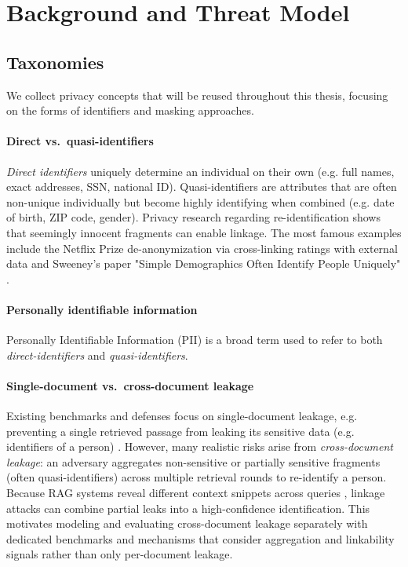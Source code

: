 \section{Background and Threat Model}\label{sec:background}
\subsection{Taxonomies}
We collect privacy concepts that will be reused throughout this thesis, focusing on the forms of identifiers and masking approaches.

\paragraph{Direct vs.\ quasi-identifiers}
\textit{Direct identifiers} uniquely determine an individual on their own (e.g. full names, exact addresses, SSN, national ID). Quasi-identifiers are attributes that are often non-unique individually but become highly identifying when combined (e.g. date of birth, ZIP code, gender). Privacy research regarding re-identification shows that seemingly innocent fragments can enable linkage. The most famous examples include the Netflix Prize de-anonymization via cross-linking ratings with external data \cite{netflixDeAnon} and Sweeney's paper "Simple Demographics Often Identify People Uniquely" \cite{simpleDemographic}. 

\paragraph{Personally identifiable information}
Personally Identifiable Information (PII) is a broad term used to refer to both \textit{direct-identifiers} and \textit{quasi-identifiers}.

\paragraph{Single-document vs.\ cross-document leakage}
Existing benchmarks and defenses focus on single-document leakage, e.g. preventing a single retrieved passage from leaking its sensitive data (e.g. identifiers of a person) \cite{ragSAGE, goodAndBad}. However, many realistic risks arise from \textit{cross-document leakage}: an adversary aggregates non-sensitive or partially sensitive fragments (often quasi-identifiers) across multiple retrieval rounds to re-identify a person. Because RAG systems reveal different context snippets across queries \cite{ragThief}, linkage attacks can combine partial leaks into a high-confidence identification. This motivates modeling and evaluating cross-document leakage separately with dedicated benchmarks and mechanisms that consider aggregation and linkability signals rather than only per-document leakage.

